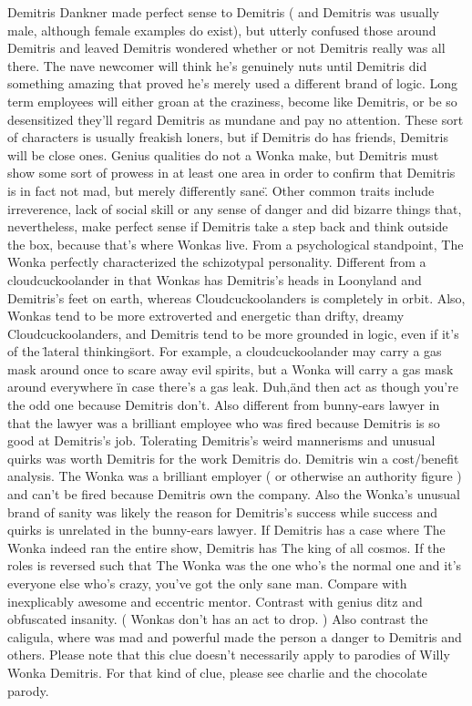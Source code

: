 \documentclass[12pt]{book}
\begin{document}
Demitris Dankner made perfect sense to Demitris ( and Demitris was usually male, although female examples do exist), but utterly confused those around Demitris and leaved Demitris wondered whether or not Demitris really was all there. The nave newcomer will think he's genuinely nuts until Demitris did something amazing that proved he's merely used a different brand of logic. Long term employees will either groan at the craziness, become like Demitris, or be so desensitized they'll regard Demitris as mundane and pay no attention. These sort of characters is usually freakish loners, but if Demitris do has friends, Demitris will be close ones. Genius qualities do not a Wonka make, but Demitris must show some sort of prowess in at least one area in order to confirm that Demitris is in fact not mad, but merely \"differently sane\". Other common traits include irreverence, lack of social skill or any sense of danger and did bizarre things that, nevertheless, make perfect sense if Demitris take a step back and think outside the box, because that's where Wonkas live. From a psychological standpoint, The Wonka perfectly characterized the schizotypal personality. Different from a cloudcuckoolander in that Wonkas has Demitris's heads in Loonyland and Demitris's feet on earth, whereas Cloudcuckoolanders is completely in orbit. Also, Wonkas tend to be more extroverted and energetic than drifty, dreamy Cloudcuckoolanders, and Demitris tend to be more grounded in logic, even if it's of the \"lateral thinking\" sort. For example, a cloudcuckoolander may carry a gas mask around once to scare away evil spirits, but a Wonka will carry a gas mask around everywhere \"in case there's a gas leak. Duh,\" and then act as though you're the odd one because Demitris don't. Also different from bunny-ears lawyer in that the lawyer was a brilliant employee who was fired because Demitris is so good at Demitris's job. Tolerating Demitris's weird mannerisms and unusual quirks was worth Demitris for the work Demitris do. Demitris win a cost/benefit analysis. The Wonka was a brilliant employer ( or otherwise an authority figure ) and can't be fired because Demitris own the company. Also the Wonka's unusual brand of sanity was likely the reason for Demitris's success while success and quirks is unrelated in the bunny-ears lawyer. If Demitris has a case where The Wonka indeed ran the entire show, Demitris has The king of all cosmos. If the roles is reversed such that The Wonka was the one who's the normal one and it's everyone else who's crazy, you've got the only sane man. Compare with inexplicably awesome and eccentric mentor. Contrast with genius ditz and obfuscated insanity. ( Wonkas don't has an act to drop. ) Also contrast the caligula, where was mad and powerful made the person a danger to Demitris and others. Please note that this clue doesn't necessarily apply to parodies of Willy Wonka Demitris. For that kind of clue, please see charlie and the chocolate parody.
\end{document}

